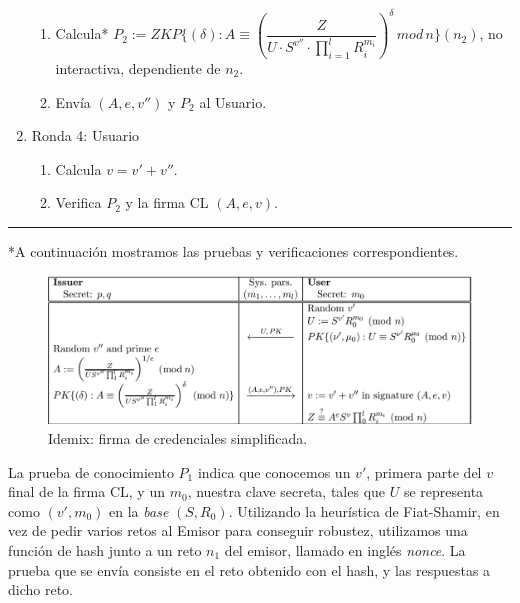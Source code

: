 \begin{algorithm}
\begin{enumerate}
\begin{enumerate}[label*=\arabic*.]
			\item Calcula* $P_2 := ZKP\{(\delta) : A \equiv \left( \dfrac{Z}{U\cdot S^{v''}\cdot \prod_{i=1}^{l} R_i^{m_i}} \right)^{\delta} \, mod \, n \}(n_2)$, no interactiva, dependiente de $n_2$.
			
			\item Envía $(A,e,v'')$ y $P_2$ al Usuario.
		\end{enumerate}
		
		
		\item Ronda 4: Usuario
		\begin{enumerate}[label*=\arabic*.]
			\item Calcula $v=v'+v''$.
			\item Verifica $P_2$ y la firma CL $(A,e,v)$.
		\end{enumerate}

	\end{enumerate}
	
\end{algorithm}
\rule{\textwidth}{1pt}



\begin{flushleft}
	*A continuación mostramos las pruebas y verificaciones correspondientes.
\end{flushleft}

\begin{figure}[bth]
	\begin{center}
		\includegraphics[width=\linewidth]{gfx/issuanceIdemix}
	\end{center}
	\caption{Idemix: firma de credenciales simplificada.}
	\label{fig:issuanceIdemix}
\end{figure}

\hfil


La prueba de conocimiento $P_1$ indica que conocemos un $v'$, primera parte del $v$ final de la firma CL, y un $m_0$, nuestra clave secreta, tales que $U$ se representa como $(v', m_0)$ en la \textit{base} $(S,R_0)$. Utilizando la heurística de Fiat-Shamir, en vez de pedir varios retos al Emisor para conseguir robustez, utilizamos una función de hash junto a un reto $n_1$ del emisor, llamado en inglés \textit{nonce}. La prueba que se envía consiste en el reto obtenido con el hash, y las respuestas a dicho reto.

